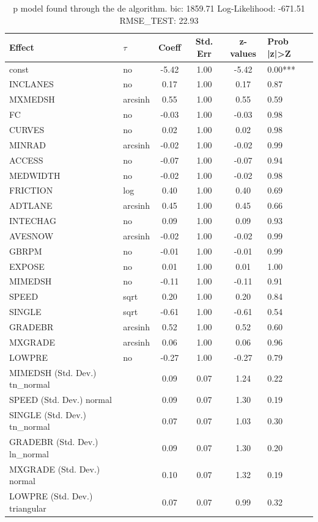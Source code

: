 \begin{table}
	\caption{p model found through the de algorithm. bic: 1859.71 Log-Likelihood: -671.51 RMSE_TEST: 22.93}
	\begin{center}
		\begin{tabular}{|l|l|c|c|c|l|}
			\hline
			Effect & $\tau$ & Coeff & Std. Err & z-values & Prob |z|>Z \\
			\hline
			const & no & -5.42 & 1.00 & -5.42 & 0.00*** \\
			\hline
			INCLANES & no & 0.17 & 1.00 & 0.17 & 0.87 \\
			\hline
			MXMEDSH & arcsinh & 0.55 & 1.00 & 0.55 & 0.59 \\
			\hline
			FC & no & -0.03 & 1.00 & -0.03 & 0.98 \\
			\hline
			CURVES & no & 0.02 & 1.00 & 0.02 & 0.98 \\
			\hline
			MINRAD & arcsinh & -0.02 & 1.00 & -0.02 & 0.99 \\
			\hline
			ACCESS & no & -0.07 & 1.00 & -0.07 & 0.94 \\
			\hline
			MEDWIDTH & no & -0.02 & 1.00 & -0.02 & 0.98 \\
			\hline
			FRICTION & log & 0.40 & 1.00 & 0.40 & 0.69 \\
			\hline
			ADTLANE & arcsinh & 0.45 & 1.00 & 0.45 & 0.66 \\
			\hline
			INTECHAG & no & 0.09 & 1.00 & 0.09 & 0.93 \\
			\hline
			AVESNOW & arcsinh & -0.02 & 1.00 & -0.02 & 0.99 \\
			\hline
			GBRPM & no & -0.01 & 1.00 & -0.01 & 0.99 \\
			\hline
			EXPOSE & no & 0.01 & 1.00 & 0.01 & 1.00 \\
			\hline
			MIMEDSH & no & -0.11 & 1.00 & -0.11 & 0.91 \\
			\hline
			SPEED & sqrt & 0.20 & 1.00 & 0.20 & 0.84 \\
			\hline
			SINGLE & sqrt & -0.61 & 1.00 & -0.61 & 0.54 \\
			\hline
			GRADEBR & arcsinh & 0.52 & 1.00 & 0.52 & 0.60 \\
			\hline
			MXGRADE & arcsinh & 0.06 & 1.00 & 0.06 & 0.96 \\
			\hline
			LOWPRE & no & -0.27 & 1.00 & -0.27 & 0.79 \\
			\hline
			MIMEDSH (Std. Dev.) tn_normal &  & 0.09 & 0.07 & 1.24 & 0.22 \\
			\hline
			SPEED (Std. Dev.) normal &  & 0.09 & 0.07 & 1.30 & 0.19 \\
			\hline
			SINGLE (Std. Dev.) tn_normal &  & 0.07 & 0.07 & 1.03 & 0.30 \\
			\hline
			GRADEBR (Std. Dev.) ln_normal &  & 0.09 & 0.07 & 1.30 & 0.20 \\
			\hline
			MXGRADE (Std. Dev.) normal &  & 0.10 & 0.07 & 1.32 & 0.19 \\
			\hline
			LOWPRE (Std. Dev.) triangular &  & 0.07 & 0.07 & 0.99 & 0.32 \\
			\hline
		\end{tabular}
	\end{center}
\end{table}